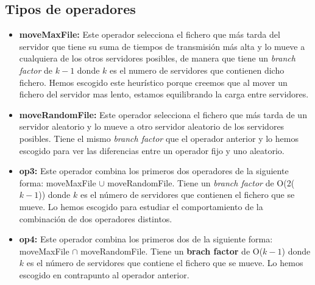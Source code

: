 \documentclass[a4paper,10pt]{report}
\begin{document}
        \subsection*{Tipos de operadores}
            \begin{itemize}
                \item \textbf{moveMaxFile:} Este operador selecciona el fichero que más tarda del servidor que tiene su suma de tiempos de transmisión más alta y lo mueve a cualquiera de los otros servidores posibles, de manera que tiene un \textit{branch factor} de $k - 1$ donde $k$ es el numero de servidores que contienen dicho fichero. Hemos escogido este heurístico porque creemos que al mover un fichero del servidor mas lento, estamos equilibrando la carga entre servidores. 
            \end{itemize}
            \begin{itemize}
                \item \textbf{moveRandomFile:} Este operador selecciona el fichero que más tarda de un servidor aleatorio y lo mueve a otro servidor aleatorio de los servidores posibles. Tiene el mismo \textit{branch factor} que el operador anterior y lo hemos escogido para ver las diferencias entre un operador fijo y uno aleatorio.
            \end{itemize}
            \begin{itemize}
                \item \textbf{op3:} Este operador combina los primeros dos operadores de la siguiente forma: moveMaxFile $\cup$ moveRandomFile. Tiene un \textit{branch factor} de O(2($k-1$)) donde $k$ es el número de servidores que contienen el fichero que se mueve. Lo hemos escogido para estudiar el comportamiento de la combinación de dos operadores distintos.
            \end{itemize}
            \begin{itemize}
                \item \textbf{op4:} Este operador combina los primeros dos de la siguiente forma: moveMaxFile $\cap$ moveRandomFile. Tiene un \textbf{brach factor} de O($k-1$) donde $k$ es el número de servidores que contiene el fichero que se mueve. Lo hemos escogido en contrapunto al operador anterior.
            \end{itemize}
            
\end{document}
